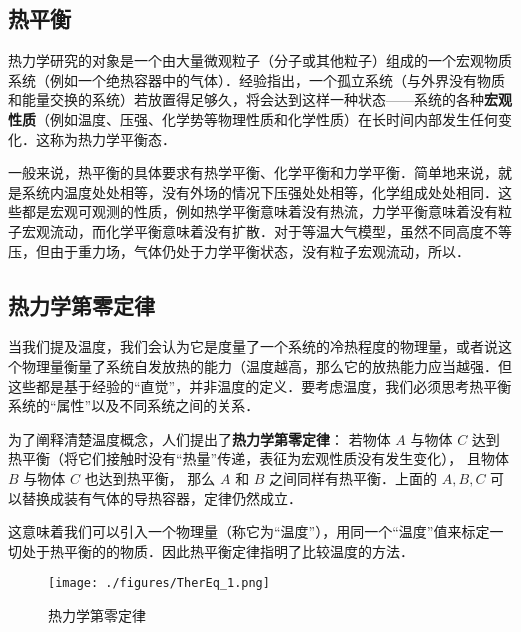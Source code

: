 
\begin{issues}
\issueDraft
\end{issues}

\subsection{热平衡}
热力学研究的对象是一个由大量微观粒子（分子或其他粒子）组成的一个宏观物质系统（例如一个绝热容器中的气体）．经验指出，一个孤立系统（与外界没有物质和能量交换的系统）若放置得足够久，将会达到这样一种状态——系统的各种\textbf{宏观性质}（例如温度、压强、化学势等物理性质和化学性质）在长时间内部发生任何变化．这称为热力学平衡态．

一般来说，热平衡的具体要求有热学平衡、化学平衡和力学平衡．简单地来说，就是系统内温度处处相等，没有外场的情况下压强处处相等，化学组成处处相同．这些都是宏观可观测的性质，例如热学平衡意味着没有热流，力学平衡意味着没有粒子宏观流动，而化学平衡意味着没有扩散．对于等温大气模型，虽然不同高度不等压，但由于重力场，气体仍处于力学平衡状态，没有粒子宏观流动，所以．

\subsection{热力学第零定律}
当我们提及温度，我们会认为它是度量了一个系统的冷热程度的物理量，或者说这个物理量衡量了系统自发放热的能力（温度越高，那么它的放热能力应当越强．但这些都是基于经验的“直觉”，并非温度的定义．要考虑温度，我们必须思考热平衡系统的“属性”以及不同系统之间的关系．

为了阐释清楚温度概念，人们提出了\textbf{热力学第零定律}：
若物体 $A$ 与物体 $C$ 达到热平衡（将它们接触时没有“热量”传递，表征为宏观性质没有发生变化）， 且物体 $B$ 与物体 $C$ 也达到热平衡， 那么 $A$ 和 $B$ 之间同样有热平衡．上面的 $A,B,C$ 可以替换成装有气体的导热容器，定律仍然成立．

这意味着我们可以引入一个物理量（称它为“温度”），用同一个“温度”值来标定一切处于热平衡的的物质．因此热平衡定律指明了比较温度的方法．
\begin{figure}[ht]
\centering
\texttt{[image: ./figures/TherEq\_1.png]}
\caption{热力学第零定律} \label{TherEq_fig1}
\end{figure}

